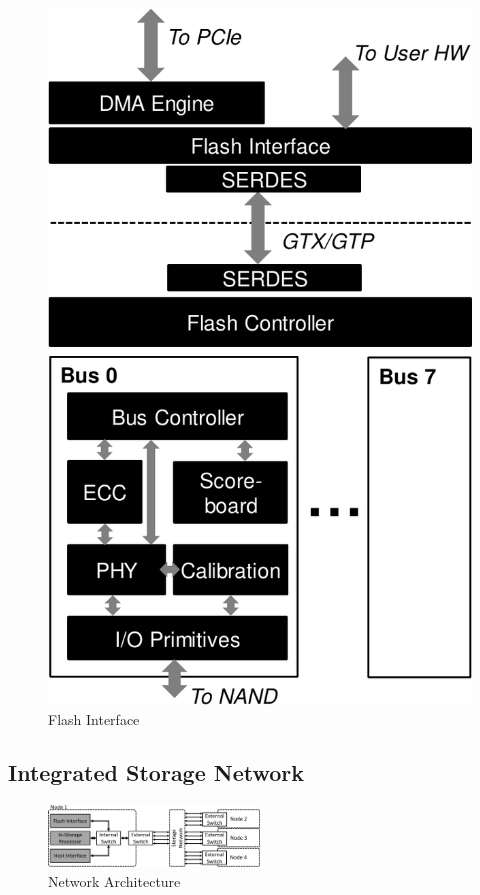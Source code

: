 \begin{figure}[h]
	\begin{center}
	\includegraphics[scale=0.4]{figures/top-arch-crop.pdf}
	\caption{Flash Interface}
	\label{fig:flashinterface}
	\end{center}
\end{figure}

\subsection{Integrated Storage Network}

\begin{figure}[h]
	\begin{center}
	\includegraphics[width=0.5\textwidth]{figures/network-architecture-crop.pdf}
	\caption{Network Architecture}
	\label{fig:networkinterface}
	\end{center}
\end{figure}


